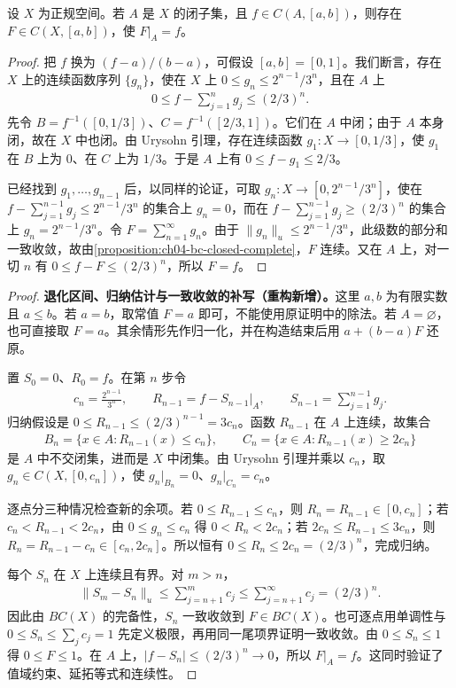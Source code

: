 \documentclass[../../main.tex]{subfiles}%
\begin{document}
\begin{theorem}\label{theorem:ch04-tietze}
设 $X$ 为正规空间。若 $A$ 是 $X$ 的闭子集，且 $f\in C(A,[a,b])$，则存在 $F\in C(X,[a,b])$，使 $F|_A=f$。
\end{theorem}
\begin{proof}
把 $f$ 换为 $(f-a)/(b-a)$，可假设 $[a,b]=[0,1]$。我们断言，存在 $X$ 上的连续函数序列 $\{g_n\}$，使在 $X$ 上 $0\le g_n\le2^{n-1}/3^n$，且在 $A$ 上
\begin{align*}
0\le f-\sum_{j=1}^ng_j\le(2/3)^n.
\end{align*}
先令 $B=f^{-1}([0,1/3])$、$C=f^{-1}([2/3,1])$。它们在 $A$ 中闭；由于 $A$ 本身闭，故在 $X$ 中也闭。由 Urysohn 引理，存在连续函数 $g_1:X\to[0,1/3]$，使 $g_1$ 在 $B$ 上为 $0$、在 $C$ 上为 $1/3$。于是 $A$ 上有 $0\le f-g_1\le2/3$。

已经找到 $g_1,\ldots,g_{n-1}$ 后，以同样的论证，可取 $g_n:X\to[0,2^{n-1}/3^n]$，使在 $f-\sum_{j=1}^{n-1}g_j\le2^{n-1}/3^n$ 的集合上 $g_n=0$，而在 $f-\sum_{j=1}^{n-1}g_j\ge(2/3)^n$ 的集合上 $g_n=2^{n-1}/3^n$。令 $F=\sum_{n=1}^\infty g_n$。由于 $\|g_n\|_u\le2^{n-1}/3^n$，此级数的部分和一致收敛，故由\cref{proposition:ch04-bc-closed-complete}，$F$ 连续。又在 $A$ 上，对一切 $n$ 有 $0\le f-F\le(2/3)^n$，所以 $F=f$。
\end{proof}
\begin{proof}
\textbf{退化区间、归纳估计与一致收敛的补写（重构新增）。}这里 $a,b$ 为有限实数且 $a\le b$。若 $a=b$，取常值 $F=a$ 即可，不能使用原证明中的除法。若 $A=\varnothing$，也可直接取 $F=a$。其余情形先作归一化，并在构造结束后用 $a+(b-a)F$ 还原。

置 $S_0=0$、$R_0=f$。在第 $n$ 步令
\begin{align*}
c_n=\frac{2^{n-1}}{3^n},\qquad
R_{n-1}=f-S_{n-1}|_A,\qquad S_{n-1}=\sum_{j=1}^{n-1}g_j.
\end{align*}
归纳假设是 $0\le R_{n-1}\le(2/3)^{n-1}=3c_n$。函数 $R_{n-1}$ 在 $A$ 上连续，故集合
\begin{align*}
B_n=\{x\in A:R_{n-1}(x)\le c_n\},\qquad
C_n=\{x\in A:R_{n-1}(x)\ge2c_n\}
\end{align*}
是 $A$ 中不交闭集，进而是 $X$ 中闭集。由 Urysohn 引理并乘以 $c_n$，取 $g_n\in C(X,[0,c_n])$，使 $g_n|_{B_n}=0$、$g_n|_{C_n}=c_n$。

逐点分三种情况检查新的余项。若 $0\le R_{n-1}\le c_n$，则 $R_n=R_{n-1}\in[0,c_n]$；若 $c_n<R_{n-1}<2c_n$，由 $0\le g_n\le c_n$ 得 $0<R_n<2c_n$；若 $2c_n\le R_{n-1}\le3c_n$，则 $R_n=R_{n-1}-c_n\in[c_n,2c_n]$。所以恒有 $0\le R_n\le2c_n=(2/3)^n$，完成归纳。

每个 $S_n$ 在 $X$ 上连续且有界。对 $m>n$，
\begin{align*}
\|S_m-S_n\|_u\le\sum_{j=n+1}^m c_j
\le\sum_{j=n+1}^{\infty}c_j=(2/3)^n.
\end{align*}
因此由 $BC(X)$ 的完备性，$S_n$ 一致收敛到 $F\in BC(X)$。也可逐点用单调性与 $0\le S_n\le\sum_jc_j=1$ 先定义极限，再用同一尾项界证明一致收敛。由 $0\le S_n\le1$ 得 $0\le F\le1$。在 $A$ 上，$|f-S_n|\le(2/3)^n\to0$，所以 $F|_A=f$。这同时验证了值域约束、延拓等式和连续性。
\end{proof}
\end{document}
